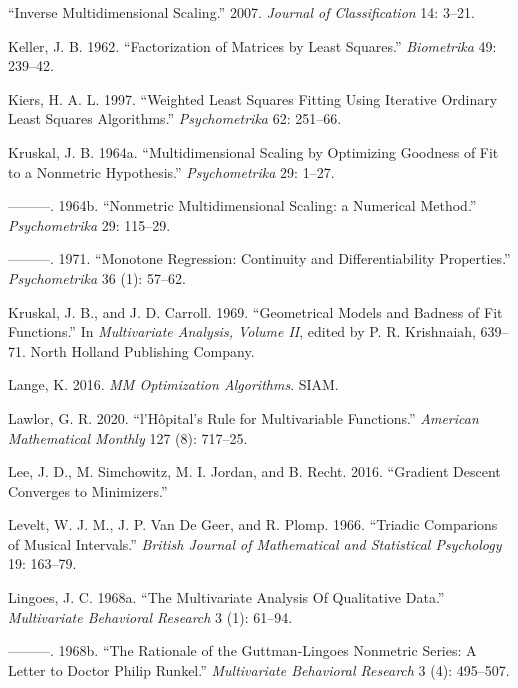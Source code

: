 \documentclass[
  12pt,
  letterpaper,
  DIV=11,
  numbers=noendperiod]{scrreprt}
\newlength{\cslhangindent}
\newenvironment{CSLReferences}[2] %
 {\begin{list}{}{%
  \setlength{\itemindent}{0pt}
  \setlength{\leftmargin}{0pt}
  \setlength{\parsep}{0pt}
  \ifodd #1
   \setlength{\leftmargin}{\cslhangindent}
   \setlength{\itemindent}{-1\cslhangindent}
  \fi
  \setlength{\itemsep}{#2\baselineskip}}}
 {\end{list}}
\theoremstyle{remark}
\begin{document}
\begin{CSLReferences}{1}{0}
{``{Inverse Multidimensional Scaling}.''} 2007. \emph{Journal of
Classification} 14: 3--21.

Keller, J. B. 1962. {``{Factorization of Matrices by Least Squares}.''}
\emph{Biometrika} 49: 239--42.

Kiers, H. A. L. 1997. {``{Weighted Least Squares Fitting Using Iterative
Ordinary Least Squares Algorithms}.''} \emph{Psychometrika} 62: 251--66.

Kruskal, J. B. 1964a. {``{Multidimensional Scaling by Optimizing
Goodness of Fit to a Nonmetric Hypothesis}.''} \emph{Psychometrika} 29:
1--27.

---------. 1964b. {``{Nonmetric Multidimensional Scaling: a Numerical
Method}.''} \emph{Psychometrika} 29: 115--29.

---------. 1971. {``{Monotone Regression: Continuity and
Differentiability Properties}.''} \emph{Psychometrika} 36 (1): 57--62.

Kruskal, J. B., and J. D. Carroll. 1969. {``{Geometrical Models and
Badness of Fit Functions}.''} In \emph{Multivariate Analysis, Volume
II}, edited by P. R. Krishnaiah, 639--71. North Holland Publishing
Company.

Lange, K. 2016. \emph{MM Optimization Algorithms}. SIAM.

Lawlor, G. R. 2020. {``{l'H{ô}pital's Rule for Multivariable
Functions}.''} \emph{American Mathematical Monthly} 127 (8): 717--25.

Lee, J. D., M. Simchowitz, M. I. Jordan, and B. Recht. 2016.
{``{Gradient Descent Converges to Minimizers}.''}

Levelt, W. J. M., J. P. Van De Geer, and R. Plomp. 1966. {``{Triadic
Comparions of Musical Intervals}.''} \emph{British Journal of
Mathematical and Statistical Psychology} 19: 163--79.

Lingoes, J. C. 1968a. {``{The Multivariate Analysis Of Qualitative
Data}.''} \emph{Multivariate Behavioral Research} 3 (1): 61--94.

---------. 1968b. {``{The Rationale of the Guttman-Lingoes Nonmetric
Series: A Letter to Doctor Philip Runkel}.''} \emph{Multivariate
Behavioral Research} 3 (4): 495--507.


\end{CSLReferences}
\end{document}
